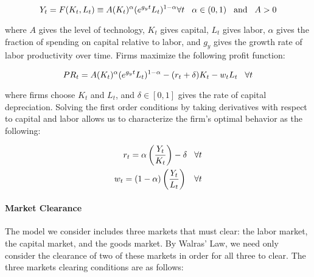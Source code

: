 \documentclass[10pt]{article}
\numberwithin{equation}{subsection}
\begin{document}
\begin{appendices}
\begin{equation}
   Y_t = F(K_t, L_t) \equiv A(K_t)^\alpha(e^{g_yt}L_t)^{1-\alpha} \forall t \hspace{3mm} \alpha \in (0, 1) \hspace{3mm} \text{and} \hspace{3mm} A>0
\end{equation}

\noindent where \(A\) gives the level of technology, \(K_t\) gives capital, \(L_t\) gives labor, \(\alpha\) gives the fraction of spending on capital relative to labor, and \(g_y\) gives the growth rate of labor productivity over time. Firms maximize the following profit function:

\begin{equation}
   PR_t = A(K_t)^\alpha(e^{g_yt}L_t)^{1-\alpha} - (r_t + \delta)K_t - w_tL_t \hspace{3mm} \forall t \label{eq:firm_profit}
\end{equation}

\noindent where firms choose \(K_t\) and \(L_t\), and \(\delta \in [0, 1]\) gives the rate of capital depreciation. Solving the first order conditions by taking derivatives with respect to capital and labor allows us to characterize the firm's optimal behavior as the following:

\begin{align}
   r_t = \alpha\left(\frac{Y_t}{K_t}\right) - \delta \hspace{3mm} \forall t \\
   w_t = (1-\alpha)\left(\frac{Y_t}{L_t}\right)\hspace{3mm} \forall t
\end{align}


\paragraph{Market Clearance}

\par The model we consider includes three markets that must clear: the labor market, the capital market, and the goods market. By Walras' Law, we need only consider the clearance of two of these markets in order for all three to clear. The three markets clearing conditions are as follows:


\end{appendices}
\end{document}
